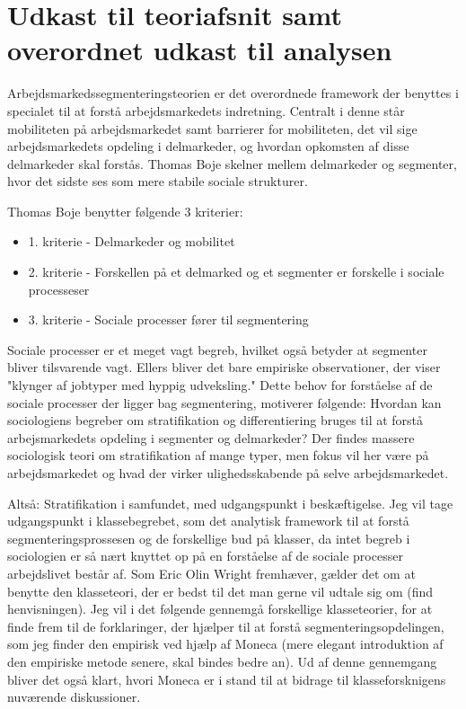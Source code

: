 
\chapter{Udkast til teoriafsnit samt overordnet udkast til analysen \label{teori}}


 Arbejdsmarkedssegmenteringsteorien er det overordnede framework der benyttes i specialet til at forstå arbejdsmarkedets indretning. Centralt i denne står mobiliteten på arbejdsmarkedet samt barrierer for mobiliteten, det vil sige arbejdsmarkedets opdeling i delmarkeder, og hvordan opkomsten af disse delmarkeder skal forstås. Thomas Boje skelner mellem delmarkeder og segmenter, hvor det sidste ses som mere stabile sociale strukturer.

 Thomas Boje benytter følgende 3 kriterier:

\begin{itemize}
  \item 1. kriterie - Delmarkeder og mobilitet
  \item 2. kriterie - Forskellen på et delmarked og et segmenter er forskelle i sociale processeser
  \item 3. kriterie - Sociale processer fører til segmentering
\end{itemize}

Sociale processer er et meget vagt begreb, hvilket også betyder at segmenter bliver tilsvarende vagt. Ellers bliver det bare empiriske observationer, der viser "klynger af jobtyper med hyppig udveksling." Dette behov for forståelse af de sociale processer der ligger bag segmentering, motiverer følgende: Hvordan kan sociologiens begreber om stratifikation og differentiering bruges til at forstå arbejsmarkedets opdeling i segmenter og delmarkeder? Der findes massere sociologisk teori om stratifikation af mange typer, men fokus vil her være på arbejdsmarkedet og hvad der virker ulighedsskabende på selve arbejdsmarkedet. 

Altså: Stratifikation i samfundet, med udgangspunkt i beskæftigelse. Jeg vil tage udgangspunkt i klassebegrebet, som det analytisk framework til at forstå segmenteringsprossesen  og de forskellige bud på klasser, da intet begreb i sociologien er så nært knyttet op på en forståelse af de sociale processer arbejdslivet  består af. 
Som Eric Olin Wright fremhæver, gælder det om at benytte den klasseteori, der er bedst til det man gerne vil udtale sig om (find henvisningen). Jeg vil i det følgende gennemgå forskellige klasseteorier, for at finde frem til de forklaringer, der hjælper til at forstå segmenteringsopdelingen, som jeg finder den empirisk ved hjælp af Moneca (mere elegant introduktion af den empiriske metode senere, skal bindes bedre an). Ud af denne gennemgang bliver det også klart, hvori Moneca er i stand til at bidrage til klasseforsknigens nuværende diskussioner. 

